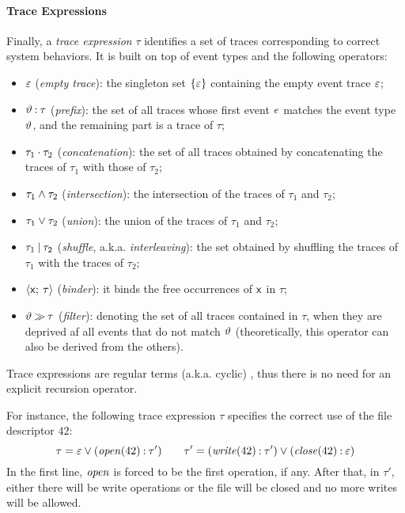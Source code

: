 
\paragraph{Trace Expressions}
Finally, a \emph{trace expression} \(\tau\) identifies a set of traces corresponding to correct system behaviors. It is built on top of event types and the following operators:
\begin{itemize}
	\item $\varepsilon$ (\emph{empty trace}): the singleton set $\{\varepsilon\}$ containing  the empty event trace $\varepsilon$;
	\item $\vartheta\mathbin{:}\tau$ (\emph{prefix}): the set of all traces whose first event $e$ matches the event type $\vartheta$, and the remaining part is a trace of $\tau$;
	\item $\tau_1\mathbin{\cdot}\tau_2$ (\emph{concatenation}): the set of all traces obtained by concatenating the traces of $\tau_1$ with those of $\tau_2$;
	\item $\tau_1\mathbin{\wedge} \tau_2$ (\emph{intersection}): the intersection of the traces of $\tau_1$ and $\tau_2$;
	\item $\tau_1\mathbin{\vee} \tau_2$ (\emph{union}): the union of the traces of $\tau_1$ and $\tau_2$;
	\item $\tau_1\mathbin{|} \tau_2$ (\emph{shuffle}, a.k.a. \emph{interleaving}): the set obtained by shuffling the traces of $\tau_1$ with the traces of $\tau_2$;
	\item ${\langle}\mathsf{x};\:{\tau}{\rangle}$ (\emph{binder}): it binds the free occurrences of $\mathsf{x}$ in $\tau$;
	\item $\vartheta\mathbin{\gg}\tau$ (\emph{filter}):
	denoting the set of all traces contained in $\tau$, when they are deprived af all events that do not match $\vartheta$ (theoretically, this operator can also be derived from the others).
\end{itemize}

Trace expressions are regular terms (a.k.a. cyclic) \cite{Courcelle83}, thus there is no need for an explicit recursion operator.

For instance, the following trace expression \(\tau\) specifies the correct use of the file descriptor \(42\):
$$
	\tau = \varepsilon \mathbin{\vee} (\mathit{open}(42) \mathbin{:} \tau')\qquad
	\tau' = (\mathit{write}(42) \mathbin{:} \tau') \mathbin{\vee} (\mathit{close}(42) \mathbin{:} \varepsilon)
$$
In the first line, \(\mathit{open}\) is forced to be the first operation, if any.
After that, in \(\tau'\), either there will be write operations or the file will be closed and no more writes will be allowed.

